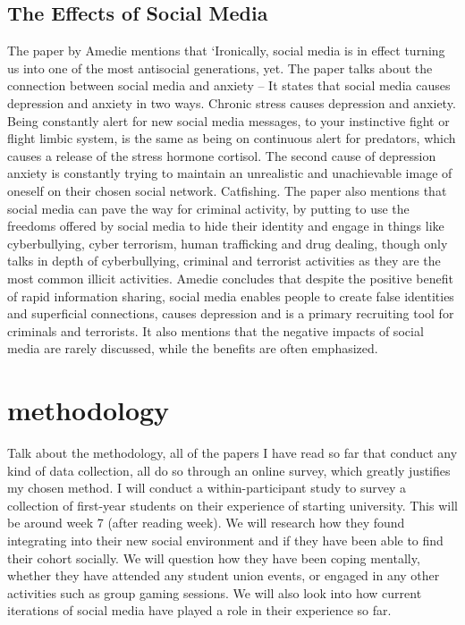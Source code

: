 \documentclass[lettersize,journal]{IEEEtran}
\begin{document}
\subsection{The Effects of Social Media}
    The paper by Amedie \cite{Amedie 2015} mentions that ‘Ironically, social
    media is in effect turning us into one of the most antisocial generations,
    yet. The paper talks about the connection between social media and anxiety
    – It states that social media causes depression and anxiety in two ways. Chronic
    stress causes depression and anxiety. Being constantly alert for new social
    media messages, to your instinctive fight or flight limbic system, is the
    same as being on continuous alert for predators, which causes a release of
    the stress hormone cortisol. The second cause of depression anxiety is
    constantly trying to maintain an unrealistic and unachievable image of
    oneself on their chosen social network. Catfishing. The paper also mentions
    that social media can pave the way for criminal activity, by putting to use
    the freedoms offered by social media to hide their identity and engage in
    things like cyberbullying, cyber terrorism, human trafficking and drug dealing,
    though only talks in depth of cyberbullying, criminal and terrorist activities
    as they are the most common illicit activities. Amedie concludes that despite
    the positive benefit of rapid information sharing, social media enables people
    to create false identities and superficial connections, causes depression and
    is a primary recruiting tool for criminals and terrorists. It also mentions
    that the negative impacts of social media are rarely discussed, while the benefits
    are often emphasized.
\section{methodology}
    Talk about the methodology, all of the papers I have read so far that conduct
    any kind of data collection, all do so through an online survey, which greatly
    justifies my chosen method. I will conduct a within-participant study to survey
    a collection of first-year students on their experience of starting university.
    This will be around week 7 (after reading week). We will research how they
    found integrating into their new social environment and if they have been able to
    find their cohort socially. We will question how they have been coping mentally,
    whether they have attended any student union events, or engaged in any other
    activities such as group gaming sessions. We will also look into how current
    iterations of social media have played a role in their experience so far.
\end{document}
